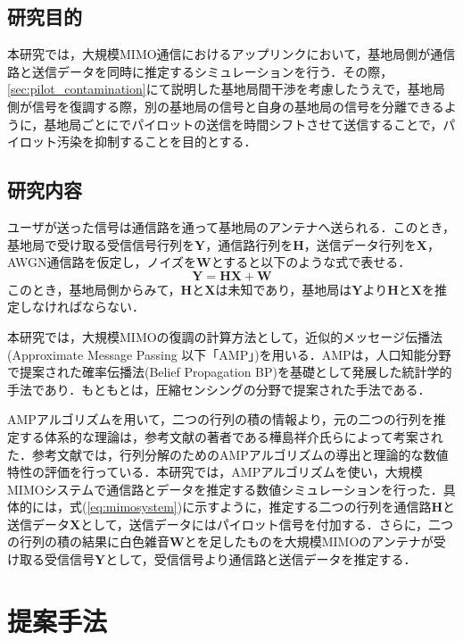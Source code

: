 \documentclass[report]{jsbook}
\begin{document}
\section{研究目的}
本研究では，大規模MIMO通信におけるアップリンクにおいて，基地局側が通信路と送信データを同時に推定するシミュレーションを行う．その際，\ref{sec:pilot_contamination}にて説明した基地局間干渉を考慮したうえで，基地局側が信号を復調する際，別の基地局の信号と自身の基地局の信号を分離できるように，基地局ごとにでパイロットの送信を時間シフトさせて送信することで，パイロット汚染を抑制することを目的とする．

\section{研究内容}
ユーザが送った信号は通信路を通って基地局のアンテナへ送られる．このとき，基地局で受け取る受信信号行列を$\bm{Y}$，通信路行列を$\bm{H}$，送信データ行列を$\bm{X}$，AWGN通信路を仮定し，ノイズを$\bm{W}$とすると以下のような式で表せる．
\begin{equation}
  \label{eq:mimosystem}
  \bm{Y} = \bm{H}\bm{X}+\bm{W}
\end{equation}
このとき，基地局側からみて，$\bm{H}$と$\bm{X}$は未知であり，基地局は$\bm{Y}$より$\bm{H}$と$\bm{X}$を推定しなければならない．

本研究では，大規模MIMOの復調の計算方法として，近似的メッセージ伝播法(Approximate Message Passing 以下「AMP」)を用いる．AMPは，人口知能分野で提案された確率伝播法(Belief Propagation BP)を基礎として発展した統計学的手法であり．もともとは，圧縮センシングの分野で提案された手法である\cite{Donoho}．

AMPアルゴリズムを用いて，二つの行列の積の情報より，元の二つの行列を推定する体系的な理論は，参考文献\cite{kabashima}の著者である樺島祥介氏らによって考案された．参考文献\cite{kabashima}では，行列分解のためのAMPアルゴリズムの導出と理論的な数値特性の評価を行っている．本研究では，AMPアルゴリズムを使い，大規模MIMOシステムで通信路とデータを推定する数値シミュレーションを行った．具体的には，式(\ref{eq:mimosystem})に示すように，推定する二つの行列を通信路$\bm{H}$と送信データ$\bm{X}$として，送信データにはパイロット信号を付加する．さらに，二つの行列の積の結果に白色雑音$\bm{W}$とを足したものを大規模MIMOのアンテナが受け取る受信信号$\bm{Y}$として，受信信号より通信路と送信データを推定する．

\chapter{提案手法}



\newpage

\newpage

\end{document}
